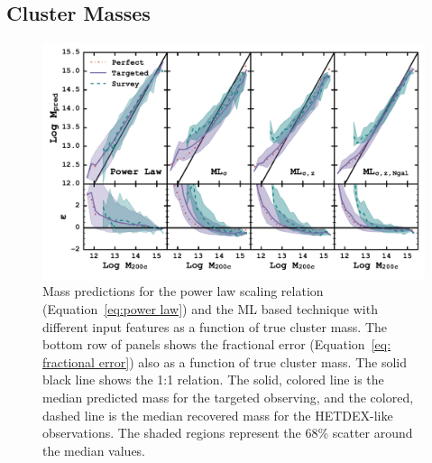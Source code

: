 \subsection{Cluster Masses}
\begin{figure} 
	\includegraphics[width=\textwidth]{figures/MLcomparison.pdf} 
	\caption{Mass predictions for the power law scaling relation (Equation~\ref{eq:power law}) and the ML based technique with different input features as a function of true cluster mass. The bottom row of panels shows the fractional error (Equation~\ref{eq: fractional error}) also as a function of true cluster mass. The solid black line shows the 1:1 relation. The solid, colored line is the median predicted mass for the targeted observing, and the colored, dashed line is the median recovered mass for the HETDEX-like observations. The shaded regions represent the 68\% scatter around the median values.} \label{fig: ML comparison} 
\end{figure}

